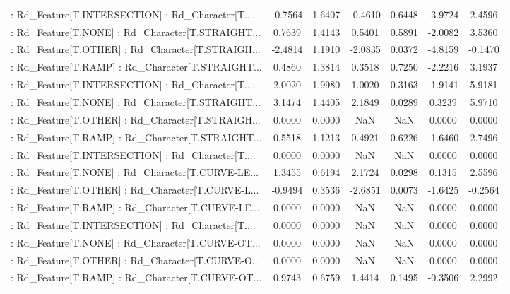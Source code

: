 \begin{longtable}{p{4cm}cccccc}
 : Rd\_Feature[T.INTERSECTION] : Rd\_Character[T.... & -0.7564 &    1.6407 & -0.4610 &       0.6448 & -3.9724 &  2.4596 \\
 : Rd\_Feature[T.NONE] : Rd\_Character[T.STRAIGHT... &  0.7639 &    1.4143 &  0.5401 &       0.5891 & -2.0082 &  3.5360 \\
 : Rd\_Feature[T.OTHER] : Rd\_Character[T.STRAIGH... & -2.4814 &    1.1910 & -2.0835 &       0.0372 & -4.8159 & -0.1470 \\
 : Rd\_Feature[T.RAMP] : Rd\_Character[T.STRAIGHT... &  0.4860 &    1.3814 &  0.3518 &       0.7250 & -2.2216 &  3.1937 \\
 : Rd\_Feature[T.INTERSECTION] : Rd\_Character[T.... &  2.0020 &    1.9980 &  1.0020 &       0.3163 & -1.9141 &  5.9181 \\
 : Rd\_Feature[T.NONE] : Rd\_Character[T.STRAIGHT... &  3.1474 &    1.4405 &  2.1849 &       0.0289 &  0.3239 &  5.9710 \\
 : Rd\_Feature[T.OTHER] : Rd\_Character[T.STRAIGH... &  0.0000 &    0.0000 &     NaN &          NaN &  0.0000 &  0.0000 \\
 : Rd\_Feature[T.RAMP] : Rd\_Character[T.STRAIGHT... &  0.5518 &    1.1213 &  0.4921 &       0.6226 & -1.6460 &  2.7496 \\
 : Rd\_Feature[T.INTERSECTION] : Rd\_Character[T.... &  0.0000 &    0.0000 &     NaN &          NaN &  0.0000 &  0.0000 \\
 : Rd\_Feature[T.NONE] : Rd\_Character[T.CURVE-LE... &  1.3455 &    0.6194 &  2.1724 &       0.0298 &  0.1315 &  2.5596 \\
 : Rd\_Feature[T.OTHER] : Rd\_Character[T.CURVE-L... & -0.9494 &    0.3536 & -2.6851 &       0.0073 & -1.6425 & -0.2564 \\
 : Rd\_Feature[T.RAMP] : Rd\_Character[T.CURVE-LE... &  0.0000 &    0.0000 &     NaN &          NaN &  0.0000 &  0.0000 \\
 : Rd\_Feature[T.INTERSECTION] : Rd\_Character[T.... &  0.0000 &    0.0000 &     NaN &          NaN &  0.0000 &  0.0000 \\
 : Rd\_Feature[T.NONE] : Rd\_Character[T.CURVE-OT... &  0.0000 &    0.0000 &     NaN &          NaN &  0.0000 &  0.0000 \\
 : Rd\_Feature[T.OTHER] : Rd\_Character[T.CURVE-O... &  0.0000 &    0.0000 &     NaN &          NaN &  0.0000 &  0.0000 \\
 : Rd\_Feature[T.RAMP] : Rd\_Character[T.CURVE-OT... &  0.9743 &    0.6759 &  1.4414 &       0.1495 & -0.3506 &  2.2992 \\

\end{longtable}
